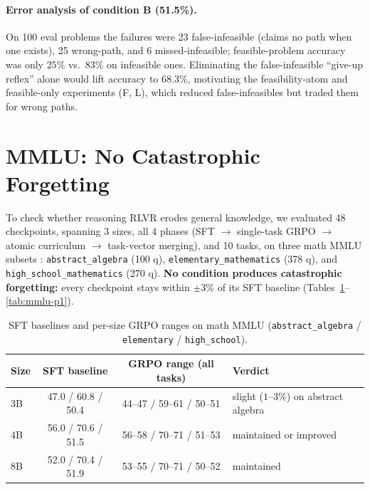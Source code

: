 \documentclass{article}
\begin{document}
\paragraph{Error analysis of condition B (51.5\%).} On 100 eval problems the failures were 23
false-infeasible (claims no path when one exists), 25 wrong-path, and 6 missed-infeasible;
feasible-problem accuracy was only $25\%$ vs.\ $83\%$ on infeasible ones. Eliminating the
false-infeasible ``give-up reflex'' alone would lift accuracy to $68.3\%$, motivating the
feasibility-atom and feasible-only experiments (F, L), which reduced false-infeasibles but traded
them for wrong paths.

\clearpage

\section{MMLU: No Catastrophic Forgetting}
\label{app:mmlu}
To check whether reasoning RLVR erodes general knowledge, we evaluated 48 checkpoints, spanning
3 sizes, all 4 phases (SFT $\to$ single-task GRPO $\to$ atomic curriculum $\to$ task-vector
merging), and 10 tasks, on three math MMLU subsets \citep{hendrycks2021mmlu}:
\texttt{abstract\_algebra} (100 q), \texttt{elementary\_mathematics} (378 q), and
\texttt{high\_school\_mathematics} (270 q). \textbf{No condition produces catastrophic forgetting:}
every checkpoint stays within $\pm 3\%$ of its SFT baseline (Tables~\ref{tab:mmlu-base}--\ref{tab:mmlu-p1}).

\begin{table}[h]
\centering\small
\caption{SFT baselines and per-size GRPO ranges on math MMLU (\texttt{abstract\_algebra} /
\texttt{elementary} / \texttt{high\_school}).}
\label{tab:mmlu-base}
\begin{tabular}{lccl}
\toprule
Size & SFT baseline & GRPO range (all tasks) & Verdict\\
\midrule
3B & 47.0 / 60.8 / 50.4 & 44--47 / 59--61 / 50--51 & slight ($1$--$3\%$) on abstract algebra\\
4B & 56.0 / 70.6 / 51.5 & 56--58 / 70--71 / 51--53 & maintained or improved\\
8B & 52.0 / 70.4 / 51.9 & 53--55 / 70--71 / 50--52 & maintained\\
\bottomrule
\end{tabular}
\end{table}
\end{document}
